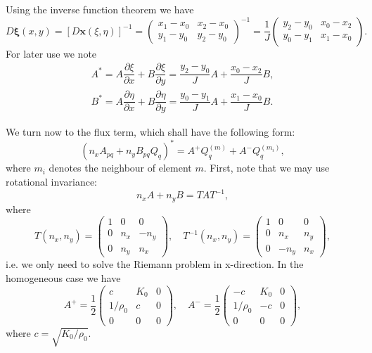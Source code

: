 \documentclass[a4paper]{scrartcl}
\begin{document}
Using the inverse function theorem we have
\begin{equation}
 D\boldsymbol{\xi}(x,y) = [D\boldsymbol{x}(\xi,\eta)]^{-1} =
 \begin{pmatrix}
  x_1-x_0 & x_2-x_0 \\
  y_1-y_0 & y_2-y_0
 \end{pmatrix}^{-1} =
 \dfrac{1}{J}
 \begin{pmatrix}
  y_2-y_0 & x_0-x_2 \\
  y_0-y_1 & x_1-x_0
 \end{pmatrix}.
\end{equation}
For later use we note
\begin{align}
 A^* = A\dfrac{\partial\xi}{\partial x} + B\dfrac{\partial\xi}{\partial y} =
 \dfrac{y_2-y_0}{J}A + \dfrac{x_0-x_2}{J}B, \\
 B^* = A\dfrac{\partial\eta}{\partial x} + B\dfrac{\partial\eta}{\partial y} =
 \dfrac{y_0-y_1}{J}A + \dfrac{x_1-x_0}{J}B.
\end{align}




We turn now to the flux term, which shall have the following form:
\begin{equation}
 (n_xA_{pq}+n_yB_{pq}Q_q)^* = A^+Q_q^{(m)} + A^-Q_q^{(m_i)},
\end{equation}
where $m_i$ denotes the neighbour of element $m$.
First, note that we may use rotational invariance:
\begin{equation}
 n_xA + n_yB = TAT^{-1},
\end{equation}
where
\begin{equation}
T(n_x,n_y)=\begin{pmatrix}
 1 & 0 & 0 \\
 0 & n_x & -n_y \\
 0 & n_y & n_x
\end{pmatrix}, \quad
T^{-1}(n_x,n_y)=\begin{pmatrix}
 1 & 0 & 0 \\
 0 & n_x & n_y \\
 0 & -n_y & n_x
\end{pmatrix},
\end{equation}
i.e. we only need to solve the Riemann problem in x-direction. In the homogeneous case we have
\begin{equation}
 A^{+} = \frac{1}{2}\begin{pmatrix}
 c & K_0 & 0 \\
 1/\rho_0 & c & 0 \\
 0 & 0 & 0
\end{pmatrix}, \quad
 A^{-} = \frac{1}{2}\begin{pmatrix}
 -c & K_0 & 0 \\
 1/\rho_0 & -c & 0 \\
 0 & 0 & 0
\end{pmatrix},
\end{equation}
where $c=\sqrt{K_0/\rho_0}$.
\end{document}
